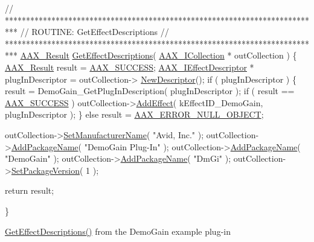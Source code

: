 \begin{DoxyCode}
\textcolor{comment}{// ***************************************************************************}
\textcolor{comment}{// ROUTINE: GetEffectDescriptions}
\textcolor{comment}{// ***************************************************************************}
\hyperlink{a00149_a4d8f69a697df7f70c3a8e9b8ee130d2f}{AAX\_Result} \hyperlink{a00326_gae0d356eef326f77cbb972e48946d4892}{GetEffectDescriptions}( \hyperlink{a00087}{AAX\_ICollection} * 
      outCollection )
\{
    \hyperlink{a00149_a4d8f69a697df7f70c3a8e9b8ee130d2f}{AAX\_Result}                result = \hyperlink{a00207_a5f8c7439f3a706c4f8315a9609811937aeddbd1bb67e3a66e6af54a4b4a7a57b3}{AAX\_SUCCESS};
    \hyperlink{a00096}{AAX\_IEffectDescriptor} *    plugInDescriptor = outCollection->
      \hyperlink{a00087_afab70588134a065a5b4d6ea6ddd5ddff}{NewDescriptor}();
    \textcolor{keywordflow}{if} ( plugInDescriptor )
    \{
        result = DemoGain\_GetPlugInDescription( plugInDescriptor );
        \textcolor{keywordflow}{if} ( result == \hyperlink{a00207_a5f8c7439f3a706c4f8315a9609811937aeddbd1bb67e3a66e6af54a4b4a7a57b3}{AAX\_SUCCESS} )
            outCollection->\hyperlink{a00087_a5ff114b8c4da2081515186f2faf65c8c}{AddEffect}( kEffectID\_DemoGain, plugInDescriptor );
    \}
    \textcolor{keywordflow}{else} result = \hyperlink{a00207_a5f8c7439f3a706c4f8315a9609811937a647cce13fa531e3a46c6eab694048a9c}{AAX\_ERROR\_NULL\_OBJECT};

    outCollection->\hyperlink{a00087_a7fbeab9630460b9bf4525512609855f0}{SetManufacturerName}( \textcolor{stringliteral}{"Avid, Inc."} );
    outCollection->\hyperlink{a00087_acf7410e0d06cf64bea36bf7d18b3456c}{AddPackageName}( \textcolor{stringliteral}{"DemoGain Plug-In"} );
    outCollection->\hyperlink{a00087_acf7410e0d06cf64bea36bf7d18b3456c}{AddPackageName}( \textcolor{stringliteral}{"DemoGain"} );
    outCollection->\hyperlink{a00087_acf7410e0d06cf64bea36bf7d18b3456c}{AddPackageName}( \textcolor{stringliteral}{"DmGi"} );      
    outCollection->\hyperlink{a00087_a4e69ac93eaac9c285c2bc3ac5b25880b}{SetPackageVersion}( 1 );     

    \textcolor{keywordflow}{return} result;

\}
\end{DoxyCode}
 \hyperlink{a00326_gae0d356eef326f77cbb972e48946d4892}{Get\+Effect\+Descriptions()} from the Demo\+Gain example plug-\/in

